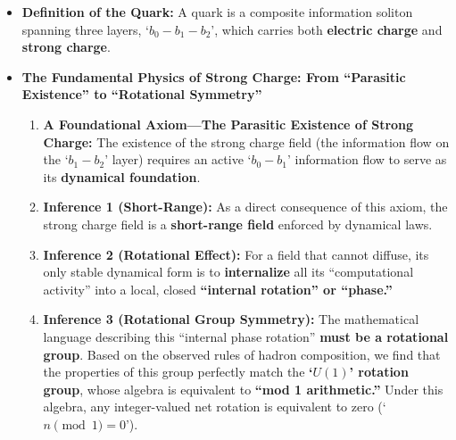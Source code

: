 \documentclass[11pt, a4paper]{article}
\begin{document}
\begin{itemize}
    \item \textbf{Definition of the Quark:} A quark is a composite information soliton spanning three layers, `$b_0-b_1-b_2$', which carries both \textbf{electric charge} and \textbf{strong charge}.
    
    \item \textbf{The Fundamental Physics of Strong Charge: From ``Parasitic Existence'' to ``Rotational Symmetry''}
    \begin{enumerate}
        \item \textbf{A Foundational Axiom—The Parasitic Existence of Strong Charge:} The existence of the strong charge field (the information flow on the `$b_1-b_2$' layer) requires an active `$b_0-b_1$' information flow to serve as its \textbf{dynamical foundation}.
        \item \textbf{Inference 1 (Short-Range):} As a direct consequence of this axiom, the strong charge field is a \textbf{short-range field} enforced by dynamical laws.
        \item \textbf{Inference 2 (Rotational Effect):} For a field that cannot diffuse, its only stable dynamical form is to \textbf{internalize} all its ``computational activity'' into a local, closed \textbf{``internal rotation'' or ``phase.''}
        \item \textbf{Inference 3 (Rotational Group Symmetry):} The mathematical language describing this ``internal phase rotation'' \textbf{must be a rotational group}. Based on the observed rules of hadron composition, we find that the properties of this group perfectly match the \textbf{`$U(1)$' rotation group}, whose algebra is equivalent to \textbf{“mod 1 arithmetic.”} Under this algebra, any integer-valued net rotation is equivalent to zero (`$n \pmod{1} = 0$').
    \end{enumerate}
    

\end{itemize}
\end{document}
